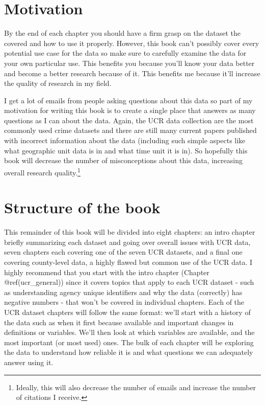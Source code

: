 \documentclass[
  12pt,
  openany]{book}
\begin{document}
\hypertarget{motivation}{%
\section{Motivation}\label{motivation}}

By the end of each chapter you should have a firm grasp on the dataset the covered and how to use it properly. However, this book can't possibly cover every potential use case for the data so make sure to carefully examine the data for your own particular use. This benefits you because you'll know your data better and become a better research because of it. This benefits me because it'll increase the quality of research in my field.

I get a lot of emails from people asking questions about this data so part of my motivation for writing this book is to create a single place that answers as many questions as I can about the data. Again, the UCR data collection are the most commonly used crime datasets and there are still many current papers published with incorrect information about the data (including such simple aspects like what geographic unit data is in and what time unit it is in). So hopefully this book will decrease the number of misconceptions about this data, increasing overall research quality.\footnote{Ideally, this will also decrease the number of emails and increase the number of citations I receive.}

\hypertarget{structure-of-the-book}{%
\section{Structure of the book}\label{structure-of-the-book}}

This remainder of this book will be divided into eight chapters: an intro chapter briefly summarizing each dataset and going over overall issues with UCR data, seven chapters each covering one of the seven UCR datasets, and a final one covering county-level data, a highly flawed but common use of the UCR data. I highly recommend that you start with the intro chapter (Chapter @ref(ucr\_general)) since it covers topics that apply to each UCR dataset - such as understanding agency unique identifiers and why the data (correctly) has negative numbers - that won't be covered in individual chapters. Each of the UCR dataset chapters will follow the same format: we'll start with a history of the data such as when it first because available and important changes in definitions or variables. We'll then look at which variables are available, and the most important (or most used) ones. The bulk of each chapter will be exploring the data to understand how reliable it is and what questions we can adequately answer using it.
\end{document}

